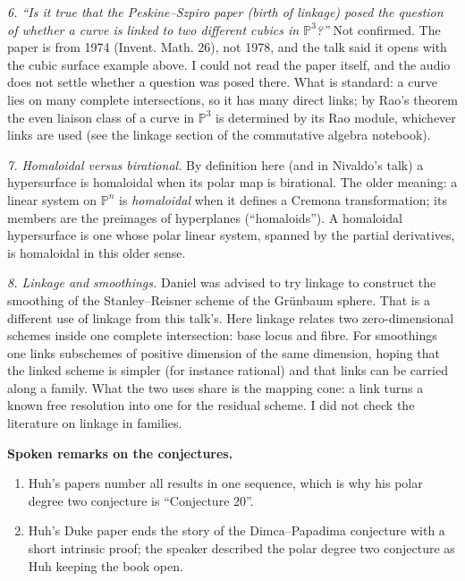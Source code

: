 \medskip\noindent
{\it 6. ``Is it true that the Peskine--Szpiro
paper (birth of linkage) posed the question
of whether a curve is linked to two
different cubics in $\mathbb{P}^3$?''} Not
confirmed. The paper is from 1974 (Invent.
Math. 26), not 1978, and the talk said it
opens with the cubic surface example above.
I could not read the paper itself, and the
audio does not settle whether a question was
posed there. What is standard: a curve lies
on many complete intersections, so it has
many direct links; by Rao's theorem the even
liaison class of a curve in $\mathbb{P}^3$
is determined by its Rao module, whichever
links are used (see the linkage section of
the commutative algebra notebook).

\medskip\noindent
{\it 7. Homaloidal versus birational.} By
definition here (and in Nivaldo's talk) a
hypersurface is homaloidal when its polar map
is birational. The older meaning: a linear
system on $\mathbb{P}^n$ is
\emph{homaloidal} when it defines a Cremona
transformation; its members are the
preimages of hyperplanes (``homaloids''). A
homaloidal hypersurface is one whose polar
linear system, spanned by the partial
derivatives, is homaloidal in this older
sense.

\medskip\noindent
{\it 8. Linkage and smoothings.} Daniel was
advised to try linkage to construct the
smoothing of the Stanley--Reisner scheme of
the Gr\"unbaum sphere. That is a different
use of linkage from this talk's. Here
linkage relates two zero-dimensional schemes
inside one complete intersection: base locus
and fibre. For smoothings one links
subschemes of positive dimension of the same
dimension, hoping that the linked scheme is
simpler (for instance rational) and that
links can be carried along a family. What
the two uses share is the mapping cone: a
link turns a known free resolution into one
for the residual scheme. I did not check the
literature on linkage in families.

\medskip\noindent
{\bf Spoken remarks on the conjectures.}
\begin{enumerate}
\item Huh's papers number all results in one
sequence, which is why his polar degree two
conjecture is ``Conjecture 20''.
\item Huh's Duke paper ends the story of
the Dimca--Papadima conjecture with a short
intrinsic proof; the speaker described the
polar degree two conjecture as Huh keeping
the book open.
\end{enumerate}



